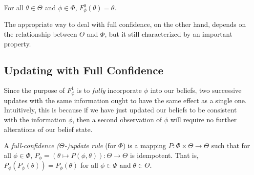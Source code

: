 \begin{CFaxioms}
	\item
		For all $\theta \in \Theta$ and $\phi \in \Phi$,
		 $F^{0}_\phi(\theta) = \theta$.
		\label{ax:zero}
\end{CFaxioms}


The appropriate way to deal with full confidence, on the other hand,
depends on the relationship between $\Theta$ and $\Phi$,
but it still characterized by an important property.


\subsection{Updating with Full Confidence}
Since the purpose of $F^1_\phi$ is to \emph{fully} incorporate $\phi$ into our beliefs,
two successive updates with the same information ought to have the same effect as a single one.
Intuitively, this is because if we have just updated our beliefs to be consistent with the information $\phi$, then a second observation of $\phi$ will require no further alterations of our belief state.

\begin{defn}
	A \emph{full-confidence ($\Theta$-)update rule} (for $\Phi$) is
	a mapping $P: \Phi \times \Theta \to \Theta$ such that
	for all $\phi \in \Phi$, 
	$P_\phi = (\theta \mapsto P(\phi,\theta)): \Theta \to \Theta$ is idempotent.
	That is,	
	$P_\phi(P_\phi(\theta)) = P_\phi(\theta)$
	 for all $\phi\in\Phi$ and $\theta \in \Theta$.
\end{defn}

